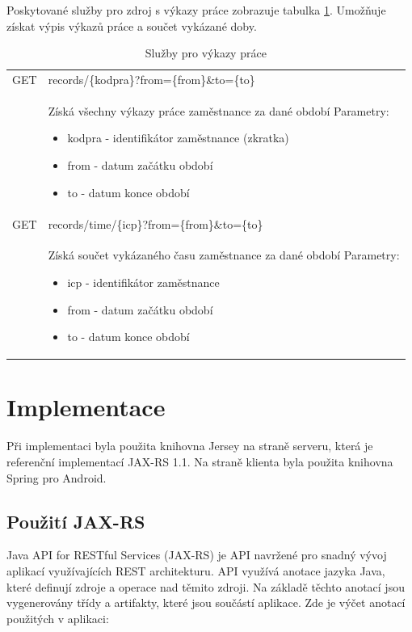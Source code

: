 \documentclass{diplomka}
\begin{document}
\noindent
Poskytované služby pro zdroj s výkazy práce zobrazuje tabulka \ref{tab:urirecords}. Umožňuje získat výpis výkazů práce a součet vykázané doby.
\begin{table}[H]
\begin{center}
\begin{tabular}{| m{2cm} |  m{10cm} |}
\hline
\rowcolor{Gray}
GET  &records/\{kodpra\}?from=\{from\}\&to=\{to\} \\ 
&  \parbox{10cm}{\vspace{5 mm}Získá všechny výkazy práce zaměstnance za dané období\\
Parametry:\begin{itemize}[noitemsep,nolistsep]
\item kodpra - identifikátor zaměstnance (zkratka)
\item from - datum začátku období
\item to - datum konce období
\end{itemize}
\vspace{5 mm}} \\ \hline
{}
GET & records/time/\{icp\}?from=\{from\}\&to=\{to\} \\ \hline
&  \parbox{10cm}{\vspace{5 mm}Získá součet vykázaného času zaměstnance za dané období\\
Parametry:\begin{itemize}[noitemsep,nolistsep]
\item icp - identifikátor zaměstnance
\item from - datum začátku období
\item to - datum konce období
\end{itemize}
\vspace{5 mm}} \\ \hline
\end{tabular}
\end{center}
\caption{Služby pro výkazy práce}
\label{tab:urirecords}
\end{table}



\section{Implementace}
Při implementaci byla použita knihovna Jersey\cite{jersey} na straně serveru, která je referenční implementací JAX-RS 1.1\cite{jaxrs}. Na straně klienta byla použita knihovna Spring pro Android.

\subsection{Použití JAX-RS}
Java API for RESTful Services (JAX-RS) je API navržené pro snadný vývoj aplikací využívajících REST architekturu. API využívá anotace jazyka Java, které definují zdroje a operace nad těmito zdroji. Na základě těchto anotací jsou vygenerovány třídy a artifakty, které jsou součástí aplikace. Zde je výčet anotací použitých v aplikaci:
\end{document}
